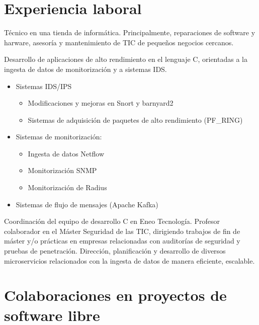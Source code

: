 \documentclass[11pt,a4paper,sans]{moderncv}
\begin{document}
\section{Experiencia laboral}
{Técnico en una tienda de informática. Principalmente, reparaciones de software y harware,
asesoría y mantenimiento de TIC de pequeños negocios cercanos.\newline{}}
{Desarrollo de aplicaciones de alto rendimiento en el lenguaje C, orientadas a la
ingesta de datos de monitorización y a sistemas IDS.\newline
\begin{itemize}%
  \item Sistemas IDS/IPS
  \begin{itemize}
    \item Modificaciones y mejoras en Snort y barnyard2
    \item Sistemas de adquisición de paquetes de alto rendimiento (PF\_RING)
  \end{itemize}
  \item Sistemas de monitorización:
  \begin{itemize}
    \item Ingesta de datos Netflow
    \item Monitorización SNMP
    \item Monitorización de Radius
  \end{itemize}
  \item Sistemas de flujo de mensajes (Apache Kafka)
\end{itemize}}
{Coordinación del equipo de desarrollo C en Eneo Tecnología.}
{Profesor colaborador en el Máster Seguridad de las TIC, dirigiendo
trabajos de fin de máster y/o prácticas en empresas relacionadas con
auditorías de seguridad y pruebas de penetración.}
{Dirección, planificación y desarrollo de diversos microservicios
relacionados con la ingesta de datos de manera eficiente, escalable.}

\section{Colaboraciones en proyectos de software libre}
\renewcommand{\listitemsymbol}{-~} %
\end{document}
